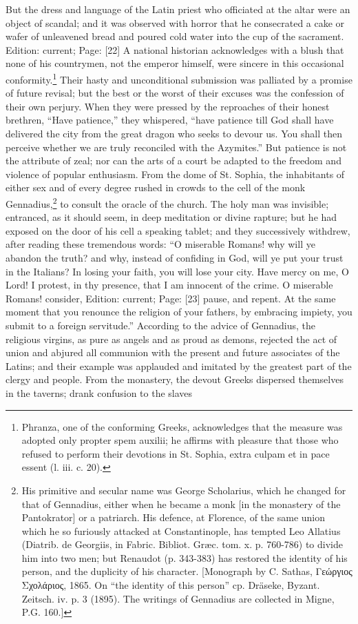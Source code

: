 But the dress and language of the Latin priest who officiated at the altar were an object of scandal; and it was observed with horror that he consecrated a cake or wafer of unleavened bread and poured cold water into the cup of the sacrament. Edition: current; Page: [22] A national historian acknowledges with a blush that none of his countrymen, not the emperor himself, were sincere in this occasional conformity.\footnote{Phranza, one of the conforming Greeks, acknowledges that the measure was adopted only propter spem auxilii; he affirms with pleasure that those who refused to perform their devotions in St. Sophia, extra culpam et in pace essent (l. iii. c. 20).} Their hasty and unconditional submission was palliated by a promise of future revisal; but the best or the worst of their excuses was the confession of their own perjury. When they were pressed by the reproaches of their honest brethren, \texthebrew{“}Have patience,\texthebrew{}” they whispered, \texthebrew{“}have patience till God shall have delivered the city from the great dragon who seeks to devour us. You shall then perceive whether we are truly reconciled with the Azymites.\texthebrew{}” But patience is not the attribute of zeal; nor can the arts of a court be adapted to the freedom and violence of popular enthusiasm. From the dome of St. Sophia, the inhabitants of either sex and of every degree rushed in crowds to the cell of the monk Gennadius,\footnote{His primitive and secular name was George Scholarius, which he changed for that of Gennadius, either when he became a monk [in the monastery of the Pantokrator] or a patriarch. His defence, at Florence, of the same union which he so furiously attacked at Constantinople, has tempted Leo Allatius (Diatrib. de Georgiis, in Fabric. Bibliot. Græc. tom. x. p. 760-786) to divide him into two men; but Renaudot (p. 343-383) has restored the identity of his person, and the duplicity of his character. [Monograph by C. Sathas, \textgreek{Γεώργιος Σχολάριος}, 1865. On \texthebrew{“}the identity of this person\texthebrew{}” cp. Dräseke, Byzant. Zeitsch. iv. p. 3 (1895). The writings of Gennadius are collected in Migne, P.G. 160.]} to consult the oracle of the church. The holy man was invisible; entranced, as it should seem, in deep meditation or divine rapture; but he had exposed on the door of his cell a speaking tablet; and they successively withdrew, after reading these tremendous words: \texthebrew{“}O miserable Romans! why will ye abandon the truth? and why, instead of confiding in God, will ye put your trust in the Italians? In losing your faith, you will lose your city. Have mercy on me, O Lord! I protest, in thy presence, that I am innocent of the crime. O miserable Romans! consider, Edition: current; Page: [23] pause, and repent. At the same moment that you renounce the religion of your fathers, by embracing impiety, you submit to a foreign servitude.\texthebrew{}” According to the advice of Gennadius, the religious virgins, as pure as angels and as proud as demons, rejected the act of union and abjured all communion with the present and future associates of the Latins; and their example was applauded and imitated by the greatest part of the clergy and people. From the monastery, the devout Greeks dispersed themselves in the taverns; drank confusion to the slaves 